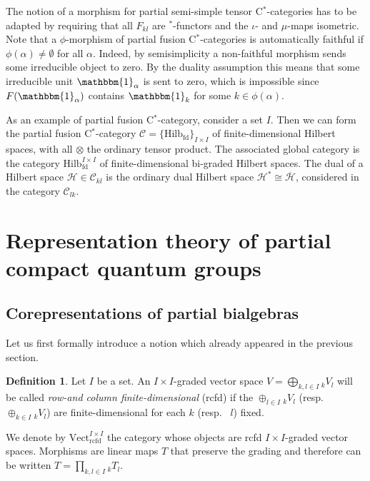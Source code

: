 \documentclass[10pt]{article}
\DeclareMathOperator{\fin}{\mathrm{fd}}
\DeclareMathOperator{\rcf}{\mathrm{rcfd}}
\newcommand{\Hsp}{\mathcal{H}}
\newcommand{\CatC}{\mathcal{C}}
\newcommand{\CatCC}{\mathscr{C}}
\newcommand{\Vectrcf}{\mathrm{Vect}^{I\times I}_{\rcf}}
\newcommand{\Hilb}{\mathrm{Hilb}}
\newcommand{\Hilbif}{\mathrm{Hilb}^{I\times I}_{\fin}}
\newcommand{\GrDA}[3]{{}_{#2}#1_{#3}} %
\theoremstyle{definition}
\newtheorem{Def}[Theorem]{Definition}
\numberwithin{equation}{section}
\begin{document}
The notion of a morphism for partial semi-simple tensor C$^*$-categories has to be adapted by requiring that all $F_{kl}$ are $^*$-functors and the $\iota$- and $\mu$-maps isometric.  Note that a $\phi$-morphism of partial fusion C$^*$-categories is automatically faithful if $\phi(\alpha)\neq \emptyset$ for all $\alpha$. Indeed, by semisimplicity a non-faithful morphism sends some irreducible object to zero. By the duality assumption this means that some irreducible unit $\mathbbm{1}_{\alpha}$ is sent to zero, which is impossible since $F(\mathbbm{1}_{\alpha})$ contains $\mathbbm{1}_k$ for some $k \in \phi(\alpha)$.

As an example of partial fusion C$^*$-category, consider a set  $I$. Then we can form the partial fusion C$^*$-category $\CatCC = \{\Hilb_{\fin}\}_{I\times I}$ of finite-dimensional Hilbert spaces, with all $\otimes$ the ordinary tensor product. The associated global category is the category $\Hilbif$ of finite-dimensional bi-graded Hilbert spaces. The dual of a Hilbert space $\Hsp \in \CatC_{kl}$ is the ordinary dual Hilbert space $\Hsp^* \cong \overline{\Hsp}$, considered in the category $\CatC_{lk}$. 


\section{Representation theory of partial compact quantum groups}

\subsection{Corepresentations of partial bialgebras}



Let us first formally introduce a notion which already appeared in the previous section.
\begin{Def} Let $I$ be a set. An $I\times I$-graded vector space $V=\bigoplus_{k,l\in I} \GrDA{V}{k}{l}$ will be called \emph{row-and column finite-dimensional} (rcfd) if the $\oplus_{l\in I} \GrDA{V}{k}{l}$ (resp.~ $\oplus_{k\in I} \GrDA{V}{k}{l}$) are finite-dimensional for each $k$ (resp.~ $l$) fixed. 
\end{Def} 

We denote by  $\Vectrcf$ the category whose objects are rcfd $I\times I$-graded vector spaces. Morphisms are linear maps $T$ that preserve the grading and therefore
can be written $T=\prod_{k,l\in I} \GrDA{T}{k}{l}$. 
\end{document}
